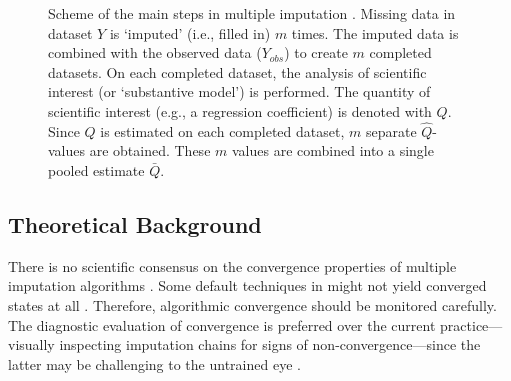 \documentclass[article]{jss}
\begin{document}
\begin{figure}
\label{fig:steps}
\centering
	\large{}
\caption{Scheme of the main steps in multiple imputation \citep[$m = 3$; adapted from][\S~1.4.1]{buur18}. {\footnotesize Missing data in dataset $Y$ is `imputed' (i.e., filled in) $m$ times. The imputed data is combined with the observed data ($Y_{obs}$) to create $m$ completed datasets. On each completed dataset, the analysis of scientific interest (or `substantive model') is performed. The quantity of scientific interest (e.g., a regression coefficient) is denoted with $Q$. Since $Q$ is estimated on each completed dataset, $m$ separate $\hat{Q}$-values are obtained. These $m$ values are combined into a single pooled estimate $\bar{Q}$.}} 
\end{figure}


\subsection{Theoretical Background} \label{sec:background}

There is no scientific consensus on the convergence properties of multiple imputation algorithms \citep{taka17}. Some default techniques in  might not yield converged states at all \citep{murr18}. Therefore, algorithmic convergence should be monitored carefully. The diagnostic evaluation of convergence is preferred over the current practice---visually inspecting imputation chains for signs of non-convergence---since the latter may be challenging to the untrained eye \citep[\S~6.5.2]{buur18}. 
\end{document}
